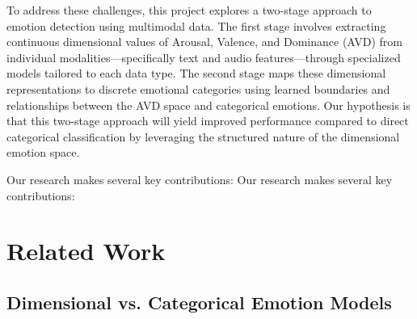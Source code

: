 \documentclass[12pt]{article}
\begin{document}
To address these challenges, this project explores a two-stage approach to emotion detection using multimodal data. The first stage involves extracting continuous dimensional values of Arousal, Valence, and Dominance (AVD) from individual modalities—specifically text and audio features—through specialized models tailored to each data type. The second stage maps these dimensional representations to discrete emotional categories using learned boundaries and relationships between the AVD space and categorical emotions. Our hypothesis is that this two-stage approach will yield improved performance compared to direct categorical classification by leveraging the structured nature of the dimensional emotion space.

Our research makes several key contributions:
Our research makes several key contributions:

    
\section{Related Work}
\label{sec:related_work}
    
\subsection{Dimensional vs. Categorical Emotion Models}

\end{document}
